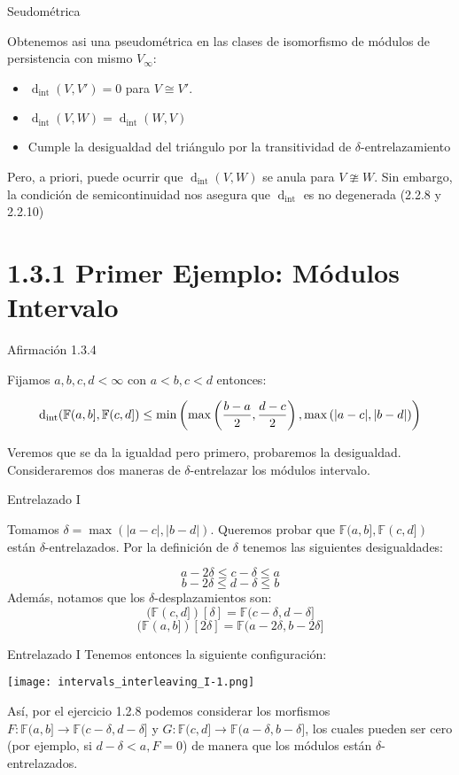 \documentclass{beamer}
\def\dint{\operatorname{d}_{\operatorname{int}}}
\def \FF{{\mathbb F}}
\begin{document}
\begin{frame}{Seudométrica}

Obtenemos asi una pseudométrica en las clases de isomorfismo de módulos de persistencia con mismo $V_\infty$:
\begin{itemize}
\item \(\dint(V,V')=0\) para $V\cong V'$. 
\item \(\dint(V,W) = \dint(W,V)\)
\item Cumple la desigualdad del triángulo por la transitividad de $\delta$-entrelazamiento
\end{itemize}
Pero, a priori, puede ocurrir que \(\dint(V,W)\) se anula para $V\ncong W$. 
\pause
Sin embargo, la condición de semicontinuidad nos asegura que $\dint$ es no degenerada (2.2.8 y 2.2.10)
 

\end{frame}

\section{1.3.1 Primer Ejemplo: Módulos Intervalo}
\begin{frame}{Afirmación 1.3.4}

Fijamos $a, b, c, d < \infty$ con $a<b, c<d$ entonces: 

\begin{equation}
\footnotesize
    \dint(\FF(a,b], \FF(c,d]) \leq \min \left( \max \left( \frac{b-a}{2}, \frac{d-c}{2} \right), \max \left( |a-c|, |b-d| \right)\right)
\end{equation}

\pause
Veremos que se da la igualdad pero primero, probaremos la desigualdad. Consideraremos dos maneras de $\delta$-entrelazar los módulos intervalo. 
\end{frame}

\begin{frame}{Entrelazado I}

Tomamos \(\delta = \max \left( |a-c|, |b-d| \right)\). Queremos probar que \(\FF(a,b], \FF(c,d])\) están $\delta$-entrelazados.
\pause
Por la definición de $\delta$ tenemos las siguientes desigualdades:

\[a-2\delta \leq c-\delta \leq a\]
\[b-2\delta \leq d-\delta \leq b\]
\pause
Además, notamos que los $\delta$-desplazamientos son:
\[(\FF(c,d])[\delta]=\FF(c-\delta,d-\delta]\]
\[(\FF(a,b])[2\delta]=\FF(a-2\delta,b-2\delta]\]
\end{frame}

\begin{frame}{Entrelazado I}
Tenemos entonces la siguiente configuración: 
\begin{center}
\texttt{[image: intervals\_interleaving\_I-1.png]}
\end{center}
\pause
Así, por el ejercicio 1.2.8 podemos considerar los morfismos \(F:\FF(a,b]\to\FF(c-\delta,d-\delta]\) y \(G:\FF(c,d]\to\FF(a-\delta,b-\delta]\), los cuales pueden ser cero (por ejemplo, si \(d-\delta<a, F=0\)) de manera que los módulos están $\delta$-entrelazados.
\end{frame}
\end{document}
